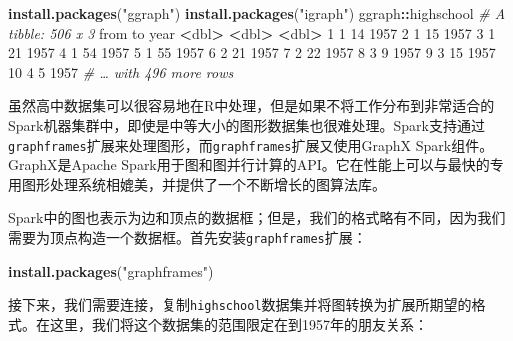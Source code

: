 \documentclass[
]{article}
\newenvironment{Shaded}{\begin{snugshade}}{\end{snugshade}}
\newcommand{\CommentTok}[1]{\textcolor[rgb]{0.56,0.35,0.01}{\textit{#1}}}
\newcommand{\DecValTok}[1]{\textcolor[rgb]{0.00,0.00,0.81}{#1}}
\newcommand{\ErrorTok}[1]{\textcolor[rgb]{0.64,0.00,0.00}{\textbf{#1}}}
\newcommand{\KeywordTok}[1]{\textcolor[rgb]{0.13,0.29,0.53}{\textbf{#1}}}
\newcommand{\NormalTok}[1]{#1}
\newcommand{\OperatorTok}[1]{\textcolor[rgb]{0.81,0.36,0.00}{\textbf{#1}}}
\newcommand{\StringTok}[1]{\textcolor[rgb]{0.31,0.60,0.02}{#1}}
\begin{document}
\begin{Shaded}
\begin{Highlighting}[]
\KeywordTok{install.packages}\NormalTok{(}\StringTok{"ggraph"}\NormalTok{)}
\KeywordTok{install.packages}\NormalTok{(}\StringTok{"igraph"}\NormalTok{)}
\NormalTok{ggraph}\OperatorTok{::}\NormalTok{highschool}
\CommentTok{# A tibble: 506 x 3}
\NormalTok{ from to year}
 \OperatorTok{<}\NormalTok{dbl}\OperatorTok{>}\StringTok{ }\ErrorTok{<}\NormalTok{dbl}\OperatorTok{>}\StringTok{ }\ErrorTok{<}\NormalTok{dbl}\OperatorTok{>}
\StringTok{ }\DecValTok{1} \DecValTok{1} \DecValTok{14} \DecValTok{1957}
 \DecValTok{2} \DecValTok{1} \DecValTok{15} \DecValTok{1957}
 \DecValTok{3} \DecValTok{1} \DecValTok{21} \DecValTok{1957}
 \DecValTok{4} \DecValTok{1} \DecValTok{54} \DecValTok{1957}
 \DecValTok{5} \DecValTok{1} \DecValTok{55} \DecValTok{1957}
 \DecValTok{6} \DecValTok{2} \DecValTok{21} \DecValTok{1957}
 \DecValTok{7} \DecValTok{2} \DecValTok{22} \DecValTok{1957}
 \DecValTok{8} \DecValTok{3} \DecValTok{9} \DecValTok{1957}
 \DecValTok{9} \DecValTok{3} \DecValTok{15} \DecValTok{1957}
\DecValTok{10} \DecValTok{4} \DecValTok{5} \DecValTok{1957}
\CommentTok{# … with 496 more rows}
\end{Highlighting}
\end{Shaded}

虽然高中数据集可以很容易地在R中处理，但是如果不将工作分布到非常适合的Spark机器集群中，即使是中等大小的图形数据集也很难处理。Spark支持通过\texttt{graphframes}扩展来处理图形，而\texttt{graphframes}扩展又使用GraphX
Spark组件。GraphX是Apache
Spark用于图和图并行计算的API。它在性能上可以与最快的专用图形处理系统相媲美，并提供了一个不断增长的图算法库。

Spark中的图也表示为边和顶点的数据框；但是，我们的格式略有不同，因为我们需要为顶点构造一个数据框。首先安装\texttt{graphframes}扩展：

\begin{Shaded}
\begin{Highlighting}[]
\KeywordTok{install.packages}\NormalTok{(}\StringTok{"graphframes"}\NormalTok{)}
\end{Highlighting}
\end{Shaded}

接下来，我们需要连接，复制\texttt{highschool}数据集并将图转换为扩展所期望的格式。在这里，我们将这个数据集的范围限定在到1957年的朋友关系：
\end{document}
